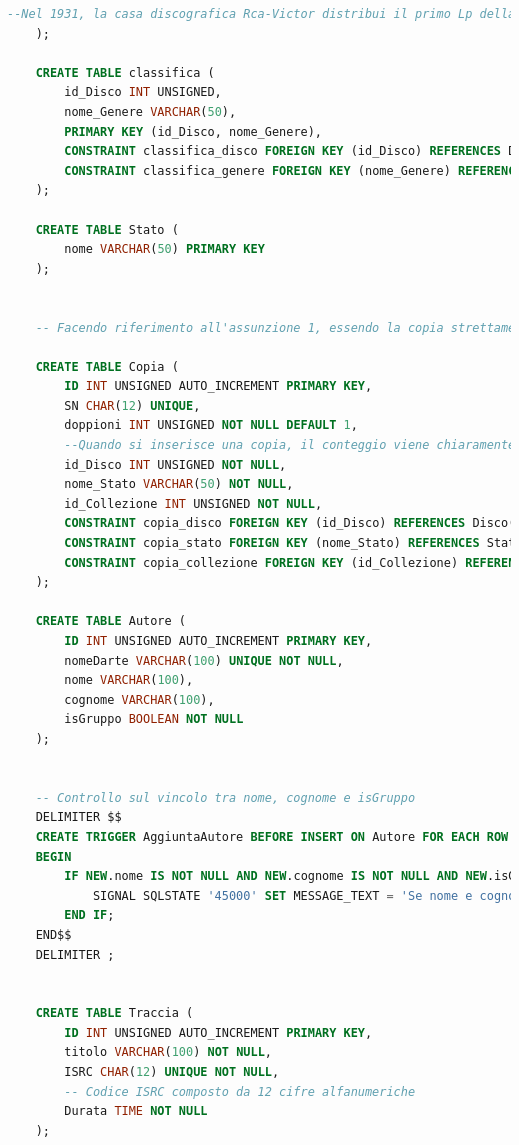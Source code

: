 \documentclass{article}
\begin{document}
\begin{lstlisting}[language=SQL]
        --Nel 1931, la casa discografica Rca-Victor distribui il primo Lp della storia: la Quinta sinfonia di Beethoven.
    );

    CREATE TABLE classifica (
        id_Disco INT UNSIGNED,
        nome_Genere VARCHAR(50),
        PRIMARY KEY (id_Disco, nome_Genere),
        CONSTRAINT classifica_disco FOREIGN KEY (id_Disco) REFERENCES Disco(ID) ON DELETE CASCADE ON UPDATE CASCADE,
        CONSTRAINT classifica_genere FOREIGN KEY (nome_Genere) REFERENCES Genere(nome) ON DELETE CASCADE ON UPDATE CASCADE
    );

    CREATE TABLE Stato (
        nome VARCHAR(50) PRIMARY KEY
    );


    -- Facendo riferimento all'assunzione 1, essendo la copia strettamente collegata alla collezione, ritengo corretto eliminare le copie di una collezione quando essa viene eliminata.

    CREATE TABLE Copia (
        ID INT UNSIGNED AUTO_INCREMENT PRIMARY KEY,
        SN CHAR(12) UNIQUE,
        doppioni INT UNSIGNED NOT NULL DEFAULT 1, 
        --Quando si inserisce una copia, il conteggio viene chiaramente inizializzato a uno (ovvero la copia stessa)
        id_Disco INT UNSIGNED NOT NULL,
        nome_Stato VARCHAR(50) NOT NULL,
        id_Collezione INT UNSIGNED NOT NULL,
        CONSTRAINT copia_disco FOREIGN KEY (id_Disco) REFERENCES Disco(ID) ON DELETE NO ACTION ON UPDATE CASCADE,
        CONSTRAINT copia_stato FOREIGN KEY (nome_Stato) REFERENCES Stato(nome) ON DELETE NO ACTION ON UPDATE CASCADE,
        CONSTRAINT copia_collezione FOREIGN KEY (id_Collezione) REFERENCES Collezione(ID) ON DELETE CASCADE ON UPDATE CASCADE 
    );

    CREATE TABLE Autore (
        ID INT UNSIGNED AUTO_INCREMENT PRIMARY KEY,
        nomeDarte VARCHAR(100) UNIQUE NOT NULL,
        nome VARCHAR(100),
        cognome VARCHAR(100),
        isGruppo BOOLEAN NOT NULL
    );


    -- Controllo sul vincolo tra nome, cognome e isGruppo
    DELIMITER $$
    CREATE TRIGGER AggiuntaAutore BEFORE INSERT ON Autore FOR EACH ROW
    BEGIN
        IF NEW.nome IS NOT NULL AND NEW.cognome IS NOT NULL AND NEW.isGruppo = TRUE THEN
            SIGNAL SQLSTATE '45000' SET MESSAGE_TEXT = 'Se nome e cognome non sono nulli, autore deve essere un singolo';
        END IF;
    END$$
    DELIMITER ;


    CREATE TABLE Traccia (
        ID INT UNSIGNED AUTO_INCREMENT PRIMARY KEY,
        titolo VARCHAR(100) NOT NULL,
        ISRC CHAR(12) UNIQUE NOT NULL, 
        -- Codice ISRC composto da 12 cifre alfanumeriche
        Durata TIME NOT NULL
    );


\end{lstlisting}
\end{document}
